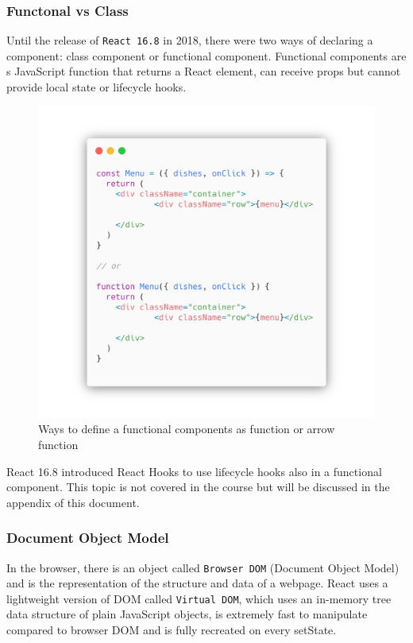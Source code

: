\subsubsection*{Functonal vs Class}
Until the release of \texttt{React 16.8} in 2018, there were two ways of declaring a component: class component or functional component. Functional components are s JavaScript function that returns a React element, can receive props but cannot provide local state or lifecycle hooks. 
\begin{figure}
    \includegraphics[width=\textwidth]{assets/class-vs-functional.png}
    \caption{Ways to define a functional components as function or arrow function}
\end{figure}

React 16.8 introduced React Hooks to use lifecycle hooks also in a functional component. This topic is not covered in the course but will be discussed in the appendix of this document.

\subsubsection*{Document Object Model}
In the browser, there is an object called \texttt{Browser DOM} (Document Object Model) and is the representation of the structure and data of a webpage. React uses a lightweight version of DOM called \texttt{Virtual DOM}, which uses an in-memory tree data structure of plain JavaScript objects, is extremely fast to manipulate compared to browser DOM and is fully recreated on every setState. 

